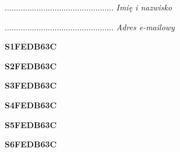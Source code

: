 \begin{turn}{90}\begin{minipage}{\linewidth} \vspace{20mm} ................................................  \textit{Imię i nazwisko}\end{minipage}\end{turn}

\begin{turn}{90}\begin{minipage}{\linewidth} \vspace{20mm} ................................................  \textit{Adres e-mailowy}\end{minipage}\end{turn}

\begin{turn}{90}\huge \begin{minipage}{\linewidth} \vspace{10mm}\textbf{S1FEDB63C}\end{minipage}\end{turn}

\begin{turn}{90}\huge \begin{minipage}{\linewidth} \vspace{10mm}\textbf{S2FEDB63C}\end{minipage}\end{turn}

\begin{turn}{90}\huge \begin{minipage}{\linewidth} \vspace{10mm}\textbf{S3FEDB63C}\end{minipage}\end{turn}

\begin{turn}{90}\huge \begin{minipage}{\linewidth} \vspace{10mm}\textbf{S4FEDB63C}\end{minipage}\end{turn}

\begin{turn}{90}\huge \begin{minipage}{\linewidth} \vspace{10mm}\textbf{S5FEDB63C}\end{minipage}\end{turn}

\begin{turn}{90}\huge \begin{minipage}{\linewidth} \vspace{10mm}\textbf{S6FEDB63C}\end{minipage}\end{turn}

